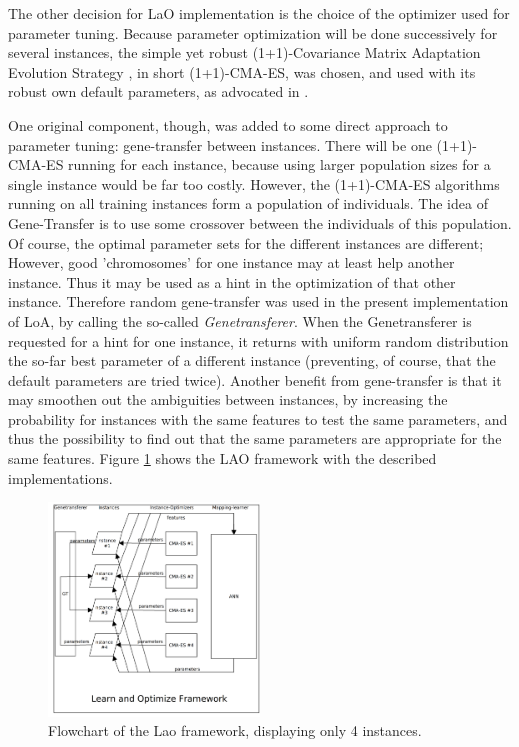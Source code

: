 \documentclass[runningheads,a4paper]{llncs}
\begin{document}
The other decision for LaO implementation is the choice of the optimizer used for parameter tuning. Because parameter optimization will be done successively for several instances, the simple yet robust (1+1)-Covariance Matrix Adaptation Evolution Strategy \cite{hansen2001ecj}, in short (1+1)-CMA-ES,  was chosen, and used with its robust own default parameters, as advocated in \cite{BibGECCO:2010}.

One original component, though, was added to some direct approach to parameter tuning: gene-transfer between instances. There will be one (1+1)-CMA-ES running for each instance, because using larger population sizes for a single instance would be far too costly. However, the (1+1)-CMA-ES algorithms running on all training instances form a population of individuals. The idea of Gene-Transfer is to use some crossover between the individuals of this population. Of course, the optimal parameter sets for the different instances are different; However, good 'chromosomes' for one instance may at least help another instance. Thus it may be used as a hint in the optimization of that other instance. Therefore random gene-transfer was used in the present implementation of LoA, by calling the so-called {\em Genetransferer}. When the Genetransferer is requested for a hint for one instance, it returns with uniform random distribution the so-far best parameter of a different instance (preventing, of course, that the default parameters are tried twice). Another benefit from gene-transfer is that it may smoothen out the ambiguities between instances, by increasing the probability for instances with the same features to test the same parameters, and thus the possibility to find out that the same parameters are appropriate for the same features. Figure \ref{figure:laoflowchart} shows the LAO framework with the described implementations.

\begin{figure}[h!]
  \centering
    \includegraphics[width=0.5\textwidth]{lao.png}
  \caption{Flowchart of the Lao framework, displaying only 4 instances.}
\label{figure:laoflowchart}
\end{figure}
\end{document}
